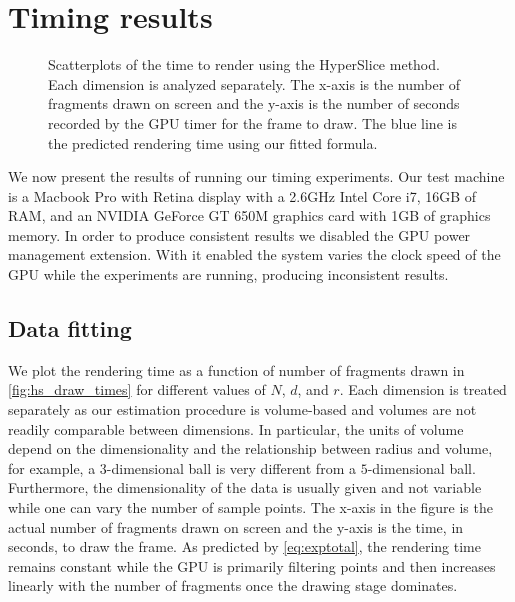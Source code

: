 \section{Timing results}
\label{sec:timingresults}

\begin{figure*}[t]
  \centering
  
  \caption{
    Scatterplots of the time to render using the HyperSlice method.
    Each dimension is analyzed separately.  The x-axis is the number of
    fragments drawn on screen and the y-axis is the number of seconds
    recorded by the GPU timer for the frame to draw.
    The blue line is the predicted rendering time using our fitted 
    formula. 
  }
  \label{fig:hs_draw_times}
\end{figure*}

We now present the results of running our timing experiments.  Our test
machine is a Macbook Pro with Retina display with a 2.6GHz Intel Core i7, 16GB
of RAM, and an NVIDIA GeForce GT 650M graphics card with 1GB of graphics
memory.  In order to produce consistent results we disabled the GPU power
management extension.  With it enabled the system varies the clock speed of
the GPU while the experiments are running, producing inconsistent results.

\subsection{Data fitting}
\label{sec:datafitting}

We plot the rendering time as a function of number of fragments
drawn in \autoref{fig:hs_draw_times} for different values of $N$, $d$, and $r$. 
Each dimension is treated separately as our estimation procedure is volume-based
and volumes are not readily comparable between dimensions.  
In particular, the units of volume depend on the dimensionality and the 
relationship between radius and volume,
for example, a $3$-dimensional ball is very different from a
$5$-dimensional ball.
Furthermore, the dimensionality of the data is usually given and not 
variable while one can vary the number of sample points.
The x-axis in the figure is
the actual number of fragments drawn on screen and the y-axis is the 
time, in seconds, to draw the frame.  As predicted by \autoref{eq:exptotal},
the rendering time remains constant while the GPU is primarily filtering 
points and then increases linearly with the number of fragments once the 
drawing stage dominates.

